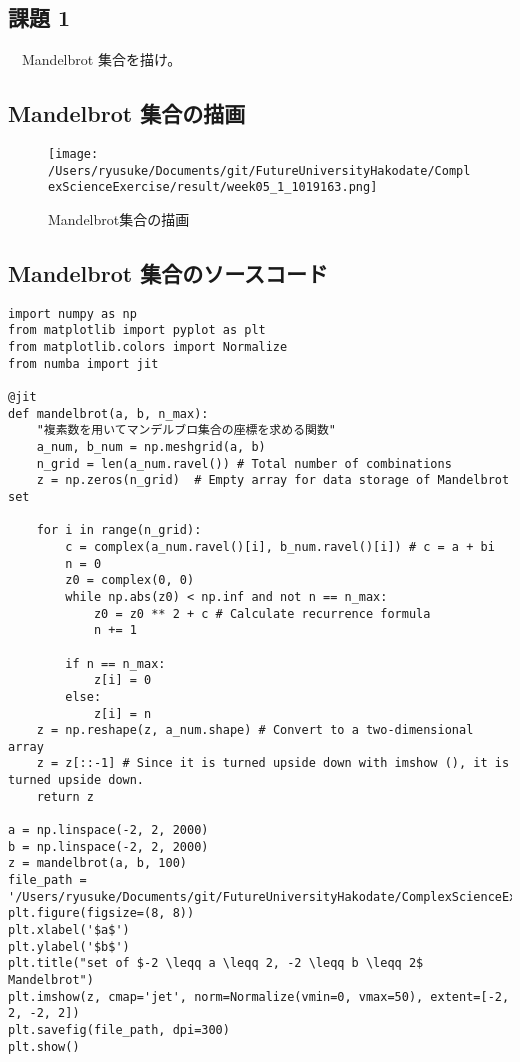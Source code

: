 \documentclass[dvipdfmx,uplatex]{jsarticle}
\begin{document}
\subsection{課題 1}
　Mandelbrot 集合を描け。\\

\subsection{Mandelbrot 集合の描画}
\begin{figure}[htbp]
\begin{center}
\texttt{[image: /Users/ryusuke/Documents/git/FutureUniversityHakodate/ComplexScienceExercise/result/week05\_1\_1019163.png]}
\caption{Mandelbrot集合の描画}
\end{center}
\end{figure}

\newpage

\subsection{Mandelbrot 集合のソースコード}

\begin{lstlisting}[caption=Pythonによるマンデルブロ集合の描画]
import numpy as np
from matplotlib import pyplot as plt
from matplotlib.colors import Normalize
from numba import jit

@jit
def mandelbrot(a, b, n_max):
    "複素数を用いてマンデルブロ集合の座標を求める関数"
    a_num, b_num = np.meshgrid(a, b)
    n_grid = len(a_num.ravel()) # Total number of combinations
    z = np.zeros(n_grid)  # Empty array for data storage of Mandelbrot set

    for i in range(n_grid):
        c = complex(a_num.ravel()[i], b_num.ravel()[i]) # c = a + bi
        n = 0
        z0 = complex(0, 0)
        while np.abs(z0) < np.inf and not n == n_max:
            z0 = z0 ** 2 + c # Calculate recurrence formula
            n += 1

        if n == n_max:
            z[i] = 0
        else:
            z[i] = n
    z = np.reshape(z, a_num.shape) # Convert to a two-dimensional array
    z = z[::-1] # Since it is turned upside down with imshow (), it is turned upside down.
    return z

a = np.linspace(-2, 2, 2000)
b = np.linspace(-2, 2, 2000)
z = mandelbrot(a, b, 100)
file_path = '/Users/ryusuke/Documents/git/FutureUniversityHakodate/ComplexScienceExercise/result/week05_1_1019163'
plt.figure(figsize=(8, 8))
plt.xlabel('$a$')
plt.ylabel('$b$')
plt.title("set of $-2 \leqq a \leqq 2, -2 \leqq b \leqq 2$ Mandelbrot")
plt.imshow(z, cmap='jet', norm=Normalize(vmin=0, vmax=50), extent=[-2, 2, -2, 2])
plt.savefig(file_path, dpi=300)
plt.show()
\end{lstlisting}
\end{document}
